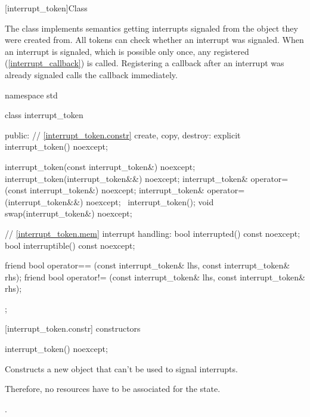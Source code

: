 {%
%
[interrupt_token]{Class }

\pnum
{}%
The class  implements semantics getting interrupts signaled from
the  object they were created from.
All tokens can check whether an interrupt was signaled.
When an interrupt is signaled, which is possible only once,
any registered  (\ref{interrupt_callback}) is called.
Registering a callback after an interrupt was already signaled calls the callback immediately.

\begin{codeblock}
namespace std {
  class interrupt_token {
  public:
    // \ref{interrupt_token.constr} create, copy, destroy:
    explicit interrupt_token() noexcept;

    interrupt_token(const interrupt_token&) noexcept;
    interrupt_token(interrupt_token&&) noexcept;
    interrupt_token& operator=(const interrupt_token&) noexcept;
    interrupt_token& operator=(interrupt_token&&) noexcept;
    ~interrupt_token();
    void swap(interrupt_token&) noexcept;

    // \ref{interrupt_token.mem} interrupt handling:
    bool interrupted() const noexcept;
    bool interruptible() const noexcept;

    friend bool operator== (const interrupt_token& lhs, const interrupt_token& rhs);
    friend bool operator!= (const interrupt_token& lhs, const interrupt_token& rhs);
  };
}
\end{codeblock}


[interrupt_token.constr]{ constructors}

%
\begin{itemdecl}
interrupt_token() noexcept;
\end{itemdecl}
\begin{itemdescr}
  \pnum\effects Constructs a new  object that can't be used to signal interrupts.
                \begin{note} Therefore, no resources have to be associated for the state.  \end{note}

  \pnum\postconditions {}.
\end{itemdescr}

}
